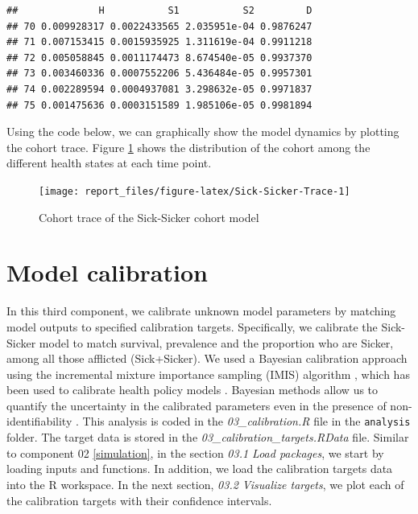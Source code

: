 \documentclass[]{book}
\newenvironment{Shaded}{\begin{snugshade}}{\end{snugshade}}
\newcommand{\CommentTok}[1]{\textcolor[rgb]{0.56,0.35,0.01}{\textit{#1}}}
\newcommand{\KeywordTok}[1]{\textcolor[rgb]{0.13,0.29,0.53}{\textbf{#1}}}
\newcommand{\NormalTok}[1]{#1}
\newcommand{\OperatorTok}[1]{\textcolor[rgb]{0.81,0.36,0.00}{\textbf{#1}}}
\begin{document}
\begin{Shaded}
\end{Shaded}

\begin{verbatim}
##              H           S1           S2         D
## 70 0.009928317 0.0022433565 2.035951e-04 0.9876247
## 71 0.007153415 0.0015935925 1.311619e-04 0.9911218
## 72 0.005058845 0.0011174473 8.674540e-05 0.9937370
## 73 0.003460336 0.0007552206 5.436484e-05 0.9957301
## 74 0.002289594 0.0004937081 3.298632e-05 0.9971837
## 75 0.001475636 0.0003151589 1.985106e-05 0.9981894
\end{verbatim}

Using the code below, we can graphically show the model dynamics by plotting the cohort trace. Figure \ref{fig:Sick-Sicker-Trace} shows the distribution of the cohort among the different health states at each time point.

\begin{figure}[H]

{\centering \texttt{[image: report\_files/figure-latex/Sick-Sicker-Trace-1]} 

}

\caption{Cohort trace of the Sick-Sicker cohort model}\label{fig:Sick-Sicker-Trace}
\end{figure}

\hypertarget{calibration}{%
\chapter{Model calibration}\label{calibration}}

In this third component, we calibrate unknown model parameters by matching model outputs to specified calibration targets. Specifically, we calibrate the Sick-Sicker model to match survival, prevalence and the proportion who are Sicker, among all those afflicted (Sick+Sicker). We used a Bayesian calibration approach using the incremental mixture importance sampling (IMIS) algorithm \citep{Steele2006}, which has been used to calibrate health policy models \citep[\citet{Menzies2017}, \citet{Rutter2018}]{Raftery2010}. Bayesian methods allow us to quantify the uncertainty in the calibrated parameters even in the presence of non-identifiability \citep{Alarid-Escudero2018b}. This analysis is coded in the \emph{03\_calibration.R} file in the \texttt{analysis} folder. The target data is stored in the \emph{03\_calibration\_targets.RData} file. Similar to component 02 \ref{simulation}, in the section \emph{03.1 Load packages}, we start by loading inputs and functions. In addition, we load the calibration targets data into the R workspace. In the next section, \emph{03.2 Visualize targets}, we plot each of the calibration targets with their confidence intervals.
\end{document}
